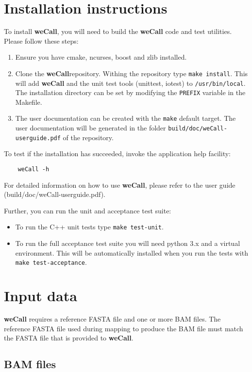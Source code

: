 \documentclass{article}
\newcommand{\wecallproduct}{\textbf{weCall}}
\begin{document}
\section{Installation instructions}

To install {\wecallproduct}, you will need to build the {\wecallproduct} code and test utilities. Please follow these steps:
\begin{enumerate}
    \item Ensure you have cmake, ncurses, boost and zlib installed.
    \item Clone the \wecallproduct repository. Withing the repository type \verb|make install|. This will add {\wecallproduct} and the unit test tools (unittest, iotest) to \verb|/usr/bin/local|. The installation directory can be set by modifying the \verb|PREFIX| variable in the Makefile.
    \item The user documentation can be created with the \verb|make| default target. The user documentation will be generated in the folder \verb|build/doc/weCall-userguide.pdf| of the repository.
\end{enumerate}

To test if the installation has succeeded, invoke the application help facility:
\begin{lstlisting}
    weCall -h
\end{lstlisting}
For detailed information on how to use \wecallproduct, please refer to the user guide (build/doc/weCall-userguide.pdf).

Further, you can run the unit and acceptance test suite:
\begin{itemize}
    \item To run the C++ unit tests type \verb|make test-unit|.
    \item To run the full acceptance test suite you will need python 3.x and a virtual environment. This will be automatically installed when you run the tests with \verb|make test-acceptance|.
\end{itemize}

\section{Input data}
{\wecallproduct} requires a reference FASTA file and one or more BAM files. The reference FASTA file used during mapping to produce the BAM file must match the
FASTA file that is provided to \wecallproduct.


\subsection{BAM files}
\end{document}
